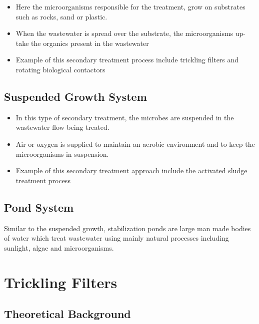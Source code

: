 \begin{itemize}
\item Here the microorganisms responsible for the treatment, grow on substrates such
as rocks, sand or plastic.
\item When the wastewater is spread over the substrate, the microorganisms up-take the organics present in the wastewater
\item Example of this secondary treatment process include trickling filters and rotating biological contactors\\
\end{itemize}

\section{Suspended Growth System}
\begin{itemize}
\item In this type of secondary treatment, the microbes are suspended in the
wastewater flow being treated. 
\item Air or oxygen is supplied to maintain an aerobic environment and to keep the microorganisms in suspension. 
\item Example of this secondary treatment approach include the activated sludge treatment process 
\end{itemize}

\section{Pond System}
Similar to the suspended growth, stabilization ponds are large man made bodies of water which treat wastewater using mainly natural processes including sunlight, algae and microorganisms.





\chapter{Trickling Filters}




\section{Theoretical Background}
		
